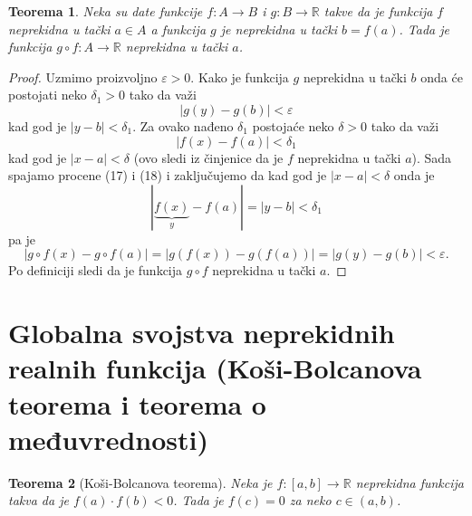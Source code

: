 \documentclass[a4paper,12pt]{article}
\theoremstyle{plain}
\newtheorem{theorem}{Teorema}[section]
\theoremstyle{definition}
\theoremstyle{remark}
\begin{document}
\begin{theorem}
Neka su date funkcije $f : A \rightarrow B$ i $g : B \rightarrow \mathbb{R}$ takve da je funkcija $f$ neprekidna u tački $a \in A$ a funkcija $g$ je neprekidna u tački $b = f(a)$. Tada je funkcija $g \circ f : A \rightarrow \mathbb{R}$ neprekidna u tački $a$.
\end{theorem}

\begin{proof}
Uzmimo proizvoljno $\varepsilon > 0$. Kako je funkcija $g$ neprekidna u tački $b$ onda će postojati neko $\delta_1 > 0$ tako da važi
\begin{equation}
|g(y) - g(b)| < \varepsilon
\end{equation}
kad god je $|y - b| < \delta_1$. Za ovako nađeno $\delta_1$ postojaće neko $\delta > 0$ tako da važi
\begin{equation}
|f(x) - f(a)| < \delta_1
\end{equation}
kad god je $|x - a| < \delta$ (ovo sledi iz činjenice da je $f$ neprekidna u tački $a$). Sada spajamo procene (17) i (18) i zaključujemo da kad god je $|x - a| < \delta$ onda je
$$|\underbrace{f(x)}_{y} - f(a)| = |y - b| < \delta_1$$
pa je
$$|g \circ f(x) - g \circ f(a)| = |g(f(x)) - g(f(a))| = |g(y) - g(b)| < \varepsilon.$$
Po definiciji sledi da je funkcija $g \circ f$ neprekidna u tački $a$.
\end{proof}

\section{Globalna svojstva neprekidnih realnih funkcija (Koši-Bolcanova teorema i teorema o međuvrednosti)}




\begin{theorem}[Koši-Bolcanova teorema]
Neka je $f : [a,b] \rightarrow \mathbb{R}$ neprekidna funkcija takva da je $f(a) \cdot f(b) < 0$. Tada je $f(c) = 0$ za neko $c \in (a,b)$.
\end{theorem}
\end{document}
